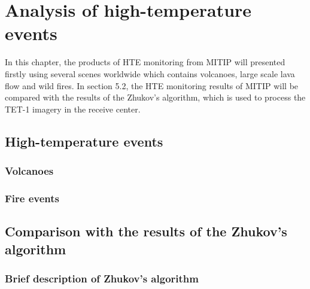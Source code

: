 \chapter{Analysis of high-temperature events}

\label{Chapter5}

In this chapter, the products of HTE monitoring from MITIP will presented firstly using several scenes worldwide which contains volcanoes, large scale lava flow and wild fires. In section 5.2, the HTE monitoring results of MITIP will be compared with the results of the Zhukov's algorithm, which is used to process the TET-1 imagery in the receive center.\\

\section{High-temperature events}


\subsection{Volcanoes}


\subsection{Fire events}


\section{Comparison with the results of the Zhukov's algorithm}


\subsection{Brief description of Zhukov's algorithm}

